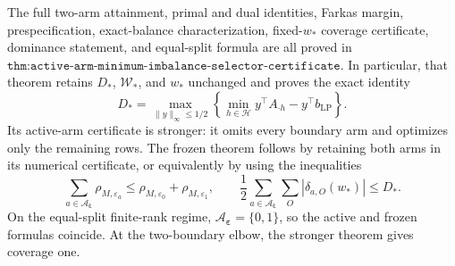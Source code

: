 The full two-arm attainment, primal and dual identities, Farkas margin, prespecification, exact-balance characterization, fixed-\(w_*\) coverage certificate, dominance statement, and equal-split formula are all proved in \(\texttt{thm:active-arm-minimum-imbalance-selector-certificate}\). In particular, that theorem retains \(D_*\), \(\mathcal W_*\), and \(w_*\) unchanged and proves the exact identity
\[
D_*=\max_{\lVert y\rVert_\infty\le1/2}
\left\{\min_{h\in\mathcal H}y^\top A_{\cdot h}-y^\top b_{\mathrm{LP}}\right\}.
\]
Its active-arm certificate is stronger: it omits every boundary arm and optimizes only the remaining rows. The frozen theorem follows by retaining both arms in its numerical certificate, or equivalently by using the inequalities
\[
\sum_{a\in\mathcal A_{\boldsymbol\varepsilon}}\rho_{M,\varepsilon_a}\le \rho_{M,\varepsilon_0}+\rho_{M,\varepsilon_1},
\qquad
\frac12\sum_{a\in\mathcal A_{\boldsymbol\varepsilon}}\sum_O|\delta_{a,O}(w_*)|\le D_*.
\]
On the equal-split finite-rank regime, \(\mathcal A_{\boldsymbol\varepsilon}=\{0,1\}\), so the active and frozen formulas coincide. At the two-boundary elbow, the stronger theorem gives coverage one.